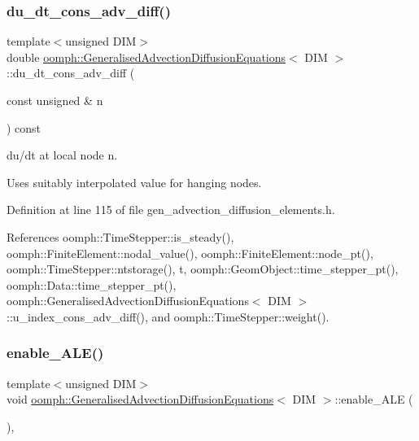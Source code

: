 \subsubsection{\texorpdfstring{du\+\_\+dt\+\_\+cons\+\_\+adv\+\_\+diff()}{du\_dt\_cons\_adv\_diff()}}
{\footnotesize\ttfamily template$<$unsigned D\+IM$>$ \\
double \hyperlink{classoomph_1_1GeneralisedAdvectionDiffusionEquations}{oomph\+::\+Generalised\+Advection\+Diffusion\+Equations}$<$ D\+IM $>$\+::du\+\_\+dt\+\_\+cons\+\_\+adv\+\_\+diff (\begin{DoxyParamCaption}\item[{const unsigned \&}]{n }\end{DoxyParamCaption}) const\hspace{0.3cm}{\ttfamily [inline]}}



du/dt at local node n. 

Uses suitably interpolated value for hanging nodes. 

Definition at line 115 of file gen\+\_\+advection\+\_\+diffusion\+\_\+elements.\+h.



References oomph\+::\+Time\+Stepper\+::is\+\_\+steady(), oomph\+::\+Finite\+Element\+::nodal\+\_\+value(), oomph\+::\+Finite\+Element\+::node\+\_\+pt(), oomph\+::\+Time\+Stepper\+::ntstorage(), t, oomph\+::\+Geom\+Object\+::time\+\_\+stepper\+\_\+pt(), oomph\+::\+Data\+::time\+\_\+stepper\+\_\+pt(), oomph\+::\+Generalised\+Advection\+Diffusion\+Equations$<$ D\+I\+M $>$\+::u\+\_\+index\+\_\+cons\+\_\+adv\+\_\+diff(), and oomph\+::\+Time\+Stepper\+::weight().

\mbox{\label{classoomph_1_1GeneralisedAdvectionDiffusionEquations_ad9a64a539984e8f0a1d3ab0b5c0d84c9}} 
\subsubsection{\texorpdfstring{enable\+\_\+\+A\+L\+E()}{enable\_ALE()}}
{\footnotesize\ttfamily template$<$unsigned D\+IM$>$ \\
void \hyperlink{classoomph_1_1GeneralisedAdvectionDiffusionEquations}{oomph\+::\+Generalised\+Advection\+Diffusion\+Equations}$<$ D\+IM $>$\+::enable\+\_\+\+A\+LE (\begin{DoxyParamCaption}{ }\end{DoxyParamCaption})\hspace{0.3cm}{\ttfamily [inline]}, {\ttfamily [virtual]}}



